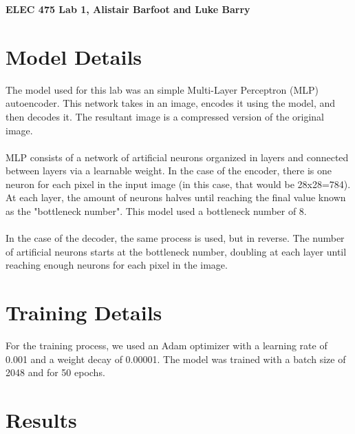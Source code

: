 \documentclass[letterpaper,11pt,twoside]{article}
\begin{document}
\begin{center}
    \LARGE
    \textbf{ELEC 475 Lab 1, Alistair Barfoot and Luke Barry}\\[12pt]
    \normalsize
\end{center}

\section{Model Details}
The model used for this lab was an simple Multi-Layer Perceptron (MLP) autoencoder. This network takes in an image, encodes it using the model, and then decodes it. The resultant image is a compressed version of the original image.
\\
\\
MLP consists of a network of artificial neurons organized in layers and connected between layers via a learnable weight. In the case of the encoder, there is one neuron for each pixel in the input image (in this case, that would be 28x28=784). At each layer, the amount of neurons halves until reaching the final value known as the "bottleneck number". This model used a bottleneck number of 8.
\\
\\
In the case of the decoder, the same process is used, but in reverse. The number of artificial neurons starts at the bottleneck number, doubling at each layer until reaching enough neurons for each pixel in the image.

\section{Training Details}
For the training process, we used an Adam optimizer with a learning rate of 0.001 and a weight decay of 0.00001. The model was trained with a batch size of 2048 and for 50 epochs.

\section{Results}
\end{document}
